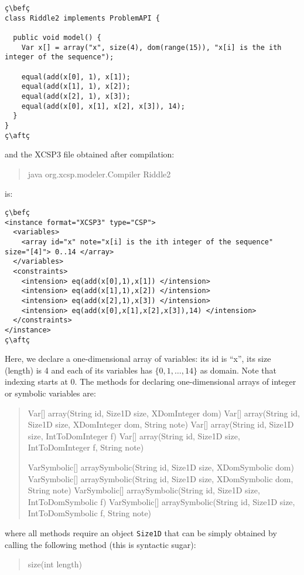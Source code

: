 \documentclass[10pt]{article}
\def\xt{{\rm XCSP3}\xspace}
\newcommand{\nn}[1]{{\tt #1}} %
\def\xt{{\rm XCSP3}\xspace}
\newenvironment{myvb}{\endgraf\small\verbatim}{\endverbatim}
\def\bef{\rule{10cm}{0.1mm}} %
\def\aft{\rule{10cm}{0.1mm}\medskip}
\begin{document}
\begin{lstlisting}
ç\befç
class Riddle2 implements ProblemAPI {

  public void model() {
    Var x[] = array("x", size(4), dom(range(15)), "x[i] is the ith integer of the sequence");
    
    equal(add(x[0], 1), x[1]);
    equal(add(x[1], 1), x[2]);
    equal(add(x[2], 1), x[3]);
    equal(add(x[0], x[1], x[2], x[3]), 14);
  }
}
ç\aftç
\end{lstlisting}
and the \xt file obtained after compilation:
\begin{quote}
\begin{myvb}
java org.xcsp.modeler.Compiler Riddle2
\end{myvb}
\end{quote}
is:
\begin{lstlisting}
ç\befç
<instance format="XCSP3" type="CSP">
  <variables>
    <array id="x" note="x[i] is the ith integer of the sequence" size="[4]"> 0..14 </array>
  </variables>
  <constraints>
    <intension> eq(add(x[0],1),x[1]) </intension>
    <intension> eq(add(x[1],1),x[2]) </intension>
    <intension> eq(add(x[2],1),x[3]) </intension>
    <intension> eq(add(x[0],x[1],x[2],x[3]),14) </intension>
  </constraints>
</instance>
ç\aftç
\end{lstlisting}

Here, we declare a one-dimensional array of variables: its id is ``x'', its size (length) is 4 and each of its variables has $\{0,1,\dots,14\}$ as domain.
Note that indexing starts at 0.
The methods for declaring one-dimensional arrays of integer or symbolic variables are:

\begin{quote}
\begin{myvb}
Var[] array(String id, Size1D size, XDomInteger dom) 
Var[] array(String id, Size1D size, XDomInteger dom, String note) 
Var[] array(String id, Size1D size, IntToDomInteger f) 
Var[] array(String id, Size1D size, IntToDomInteger f, String note) 

VarSymbolic[] arraySymbolic(String id, Size1D size, XDomSymbolic dom) 
VarSymbolic[] arraySymbolic(String id, Size1D size, XDomSymbolic dom, String note)
VarSymbolic[] arraySymbolic(String id, Size1D size, IntToDomSymbolic f) 
VarSymbolic[] arraySymbolic(String id, Size1D size, IntToDomSymbolic f, String note)
\end{myvb}
\end{quote}

where all methods require an object \nn{Size1D} that can be simply obtained by calling the following method (this is syntactic sugar):
\begin{quote}
\begin{myvb}
size(int length)
\end{myvb}
\end{quote}
\end{document}
